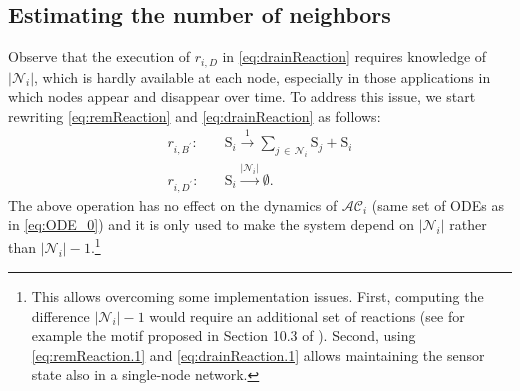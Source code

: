 \documentclass[journal]{IEEEtran}
\newcommand{\mol}[1]{\ensuremath{\textrm{#1}}}
\begin{document}
\subsection{Estimating the number of neighbors}
{Observe that the execution of $r_{i,D}$ in \eqref{eq:drainReaction} requires knowledge of $|\mathcal{N}_{i}|$, which is hardly available at each node, especially in those applications in which nodes appear and disappear over time.} 
{To address this issue,
we start rewriting \eqref{eq:remReaction} and \eqref{eq:drainReaction} as follows:
\begin{align} \label{eq:remReaction.1}
	r_{i,{B}^\prime}:&  \quad \mol{S}_{i}\stackrel{1}{\longrightarrow}  \sum_{j\, \in \, \mathcal{N}_i} \mol{S}_{j} + \mol{S}_{i}\\ \label{eq:drainReaction.1}
	r_{i, {D}^\prime}:& \quad \mol{S}_i  \stackrel{|\mathcal{N}_i|}{\longrightarrow} \emptyset. 
 \end{align}
The above operation has no effect on the dynamics of $\mathcal{AC}_i$ (same set of ODEs as in \eqref{eq:ODE_0}) and it is only used to make the system depend on $|\mathcal{N}_i|$ rather than $|\mathcal{N}_i| -1$.}\footnote{{This allows overcoming some implementation issues. First, computing the difference $|\mathcal N_i|-1$ would require an additional set of reactions (see for example the motif proposed in Section 10.3 of \cite{MeTh}). Second, using \eqref{eq:remReaction.1} and \eqref{eq:drainReaction.1} allows maintaining the sensor state also in a single-node network.}}
\end{document}
